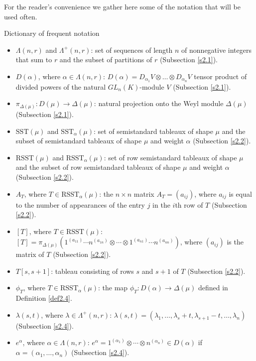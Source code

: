 \documentclass[11pt]{article}
\theoremstyle{definition}
\numberwithin{equation}{section}
\newcommand{\al}{\alpha}
\numberwithin{equation}{section}
\begin{document}
 For the reader’s convenience we gather here some of the notation that will be used often. 
 \begin{center}
 	Dictionary of frequent notation
 \end{center}
{\small \begin{itemize}
	
 \item $\Lambda(n,r)$ and $\Lambda^+(n,r)$: set of sequences of length $n$ of nonnegative integers that sum to $r$ and the subset of partitions of $r$ (Subsection \ref{s2.1}).
	\item $D(\al)$, where $\alpha \in \Lambda(n,r)$: $D(\al)=D_{\al_1}V\otimes \dots \otimes D_{\al_n}V$ tensor product of divided powers of the natural $GL_n(K)$-module $V$ (Subsection \ref{s2.1}).
	\item $\pi_{\Delta(\mu)}:D(\mu) \to \Delta(\mu)$: natural projection onto the Weyl module $\Delta(\mu)$ (Subsection \ref{s2.1}).
	\item $\mathrm{SST}(\mu)$ and $\mathrm{SST}_{\alpha}(\mu)$: set of semistandard tableaux of shape $\mu$ and the subset of semistandard tableaux of shape $\mu$ and weight $\alpha$ (Subsection \ref{s2.2}).
	\item $\mathrm{RSST}(\mu)$ and $\mathrm{RSST}_{\alpha}(\mu)$: set of row semistandard tableaux of shape $\mu$ and the subset of row semistandard tableaux of shape $\mu$ and weight $\alpha$ (Subsection \ref{s2.2}).
	\item $A_T$, where $T \in \mathrm{RSST}_{\alpha}(\mu)$: the $n \times n$ matrix $A_T=(a_{ij})$, where $a_{ij}$ is equal to the number of appearances of the entry $j$ in the $i$th row of $T$ (Subsection \ref{s2.2}).
	\item $[T]$, where $ T \in \mathrm{RSST}(\mu)$: $[T]=\pi_{\Delta(\mu)}(1^{(a_{11})} \cdots n^{(a_{1n})} \otimes \cdots \otimes 1^{(a_{n1})} \cdots n^{(a_{nn})})$, where $(a_{ij})$ is the matrix of $T$ (Subsection \ref{s2.2}). 
	\item $T[s,s+1]$: tableau consisting of rows $s$ and $s+1$ of $T$ (Subsection \ref{s2.2}).
	\item $\phi_T$, where $T \in \mathrm{RSST}_{\alpha}(\mu)$: the map $\phi_T: D(\alpha) \to \Delta(\mu)$ defined in Definition \ref{def2.4}.
	\item $\lambda({s,t})$, where $\lambda \in \Lambda^+(n,r)$: $\lambda({s,t})=(\lambda_1, \dots, \lambda_s+t, \lambda_{s+1}-t,\dots, \lambda_n)$ (Subsection \ref{s2.4}).
	\item $e^{\al}$, where $\alpha \in \Lambda(n,r)$: $e^{\al} =1^{(\al_1)} \otimes \cdots \otimes n^{(\al_n)} \in D(\al)$ if $\alpha =(\alpha_1, \dots, \alpha_n)$ (Subsection \ref{s2.4}).


\end{itemize}}
\end{document}
